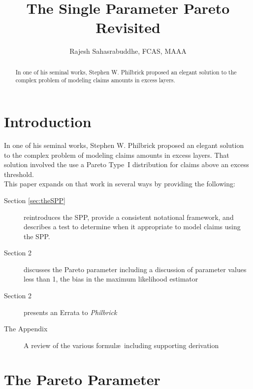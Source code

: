 \documentclass[]{article} %
\title{The Single Parameter Pareto Revisited}
\author{Rajesh Sahasrabuddhe, FCAS, MAAA}
\newcommand{\philbrick}{\textit{Philbrick}}
\begin{document}
\maketitle

\begin{abstract}
In one of his seminal works, Stephen W. Philbrick proposed an elegant solution to the complex problem of modeling claims amounts in excess layers. 

\end{abstract}

\section{Introduction}
In one of his seminal works, Stephen W. Philbrick\cite{Philbrick} proposed an elegant solution to the complex problem of modeling claims amounts in excess layers. That solution involved the use a Pareto Type~I distribution for claims above an excess threshold.\\

This paper expands on that work in several ways by providing the following:
\begin{description}
	\item[Section \ref{sec:theSPP}] reintroduces the SPP, provide a consistent notational framework, and describes a test to determine when it appropriate to model claims using the SPP.
	\item[Section 2] discusses the Pareto parameter including a discussion of parameter values less than 1, the bias in the maximum likelihood estimator
	\item[Section 2] presents an Errata to \philbrick
	\item[The Appendix] A review of the various formul\ae~including supporting derivation
\end{description}

\section{The Pareto Parameter}
\end{document}
